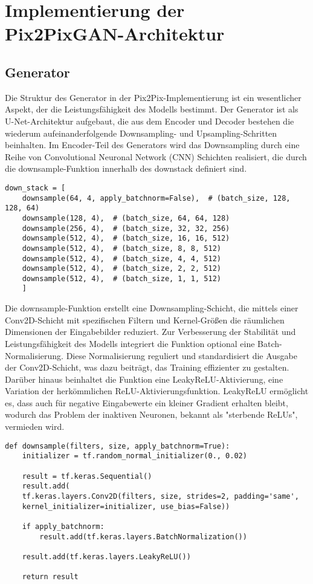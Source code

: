 \section{Implementierung der Pix2PixGAN-Architektur}
\subsection{Generator}

Die Struktur des Generator in der Pix2Pix-Implementierung ist ein wesentlicher Aspekt, der die Leistungsfähigkeit des Modells bestimmt. Der Generator ist als U-Net-Architektur aufgebaut, die aus dem Encoder und Decoder bestehen die wiederum  aufeinanderfolgende Downsampling- und Upsampling-Schritten beinhalten.
\newline
Im Encoder-Teil des Generators wird das Downsampling durch eine Reihe von Convolutional Neuronal Network (CNN) Schichten realisiert, die durch die downsample-Funktion innerhalb des downstack definiert sind. 
\newpage
\begin{lstlisting}[language=pyhaff, caption={Downsampling-Schritt}, label={cod:Pix2PixGAN Generator}]
	down_stack = [
	downsample(64, 4, apply_batchnorm=False),  # (batch_size, 128, 128, 64)
	downsample(128, 4),  # (batch_size, 64, 64, 128)
	downsample(256, 4),  # (batch_size, 32, 32, 256)
	downsample(512, 4),  # (batch_size, 16, 16, 512)
	downsample(512, 4),  # (batch_size, 8, 8, 512)
	downsample(512, 4),  # (batch_size, 4, 4, 512)
	downsample(512, 4),  # (batch_size, 2, 2, 512)
	downsample(512, 4),  # (batch_size, 1, 1, 512)
	]
\end{lstlisting}

Die downsample-Funktion erstellt eine Downsampling-Schicht, die mittels einer Conv2D-Schicht mit spezifischen Filtern und Kernel-Größen die räumlichen Dimensionen der Eingabebilder reduziert. Zur Verbesserung der Stabilität und Leistungsfähigkeit des Modells integriert die Funktion optional eine Batch-Normalisierung. Diese Normalisierung reguliert und standardisiert die Ausgabe der Conv2D-Schicht, was dazu beiträgt, das Training effizienter zu gestalten.
Darüber hinaus beinhaltet die Funktion eine LeakyReLU-Aktivierung, eine Variation der herkömmlichen ReLU-Aktivierungsfunktion. LeakyReLU ermöglicht es, dass auch für negative Eingabewerte ein kleiner Gradient erhalten bleibt, wodurch das Problem der inaktiven Neuronen, bekannt als "sterbende ReLUs", vermieden wird.

\begin{lstlisting}[language=pyhaff, caption={Downsampling-Schicht}, label={cod:Pix2PixGAN Generator}]
	def downsample(filters, size, apply_batchnorm=True):
	initializer = tf.random_normal_initializer(0., 0.02)
	
	result = tf.keras.Sequential()
	result.add(
	tf.keras.layers.Conv2D(filters, size, strides=2, padding='same',
	kernel_initializer=initializer, use_bias=False))
	
	if apply_batchnorm:
		result.add(tf.keras.layers.BatchNormalization())
	
	result.add(tf.keras.layers.LeakyReLU())
	
	return result
\end{lstlisting}

